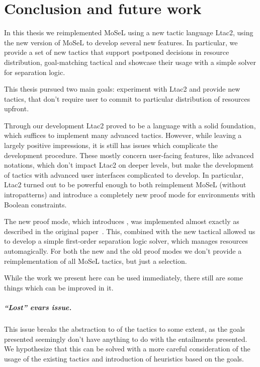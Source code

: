 \chapter{Conclusion and future work}

\vspace{-2em}
In this thesis we reimplemented MoSeL using a new tactic language Ltac2, using the new version of MoSeL to develop several new features.
In particular, we provide a set of new tactics that support postponed decisions in resource distribution, goal-matching tactical and showcase their usage with a simple solver for separation logic.

This thesis pursued two main goals: experiment with Ltac2 and provide new tactics, that don't require user to commit to particular distribution of resources upfront.

Through our development Ltac2 proved to be a language with a solid foundation, which suffices to implement many advanced tactics.
However, while leaving a largely positive impressions, it is still has issues which complicate the development procedure.
These mostly concern user-facing features, like advanced notations, which don't impact Ltac2 on deeper levels, but make the development of tactics with advanced user interfaces complicated to develop.
In particular, Ltac2 turned out to be powerful enough to both reimplement MoSeL (without intropatterns) and introduce a completely new proof mode for environments with Boolean constraints.

The new proof mode, which introduces , was implemented almost exactly as described in the original paper~\cite{harlandResourceDistributionBooleanConstraints2003}.
This, combined with the new tactical  allowed us to develop a simple first-order separation logic solver, which manages resources automagically.
For both the new and the old proof modes we don't provide a reimplementation of all MoSeL tactics, but just a selection.

While the work we present here can be used immediately, there still are some things which can be improved in it.
\paragraph{``Lost'' evars issue.}
  This issue breaks the abstraction to of the tactics to some extent, as the goals presented seemingly don't have anything to do with the entailments presented.
  We hypothesize that this can be solved with a more careful consideration of the usage of the existing tactics and introduction of heuristics based on the goals.

